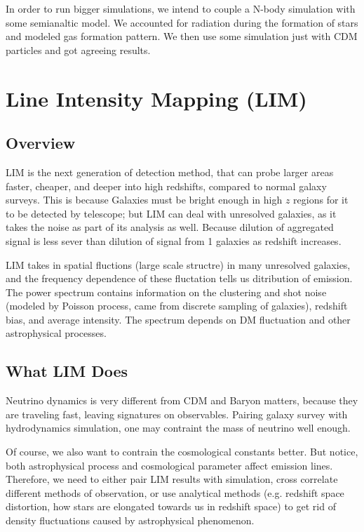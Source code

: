 \documentclass[11pt]{article}
\begin{document}
In order to run bigger simulations, we intend to couple a N-body simulation with some semianaltic model. We accounted for radiation during the formation of stars and modeled gas formation pattern. We then use some simulation just with CDM particles and got agreeing results. 

\section{Line Intensity Mapping (LIM)\cite{KovetzStatusReport}}
\subsection*{Overview}
LIM is the next generation of detection method, that can probe larger areas faster, cheaper, and deeper into high redshifts, compared to normal galaxy surveys. This is because Galaxies must be bright enough in high $z$ regions for it to be detected by telescope; but LIM can deal with unresolved galaxies, as it takes the noise as part of its analysis as well. Because dilution of aggregated signal is less sever than dilution of signal from 1 galaxies as redshift increases.

LIM takes in spatial fluctions (large scale structre) in many unresolved galaxies, and the frequency dependence of these fluctation tells us ditribution of emission. The power spectrum contains information on the clustering and shot noise (modeled by Poisson process, came from discrete sampling of galaxies), redshift bias, and average intensity. The spectrum depends on DM fluctuation and other astrophysical processes. 

\subsection*{What LIM Does}
Neutrino dynamics is very different from CDM and Baryon matters, because they are traveling fast, leaving signatures on observables. Pairing galaxy survey with hydrodynamics simulation, one may contraint the mass of neutrino well enough. 

Of course, we also want to contrain the cosmological constants better. But notice, both astrophysical process and cosmological parameter affect emission lines. Therefore, we need to either pair LIM results with simulation, cross correlate different methods of observation, or use analytical methods (e.g. redshift space distortion, how stars are elongated towards us in redshift space) to get rid of density fluctuations caused by astrophysical phenomenon. 
\end{document}

